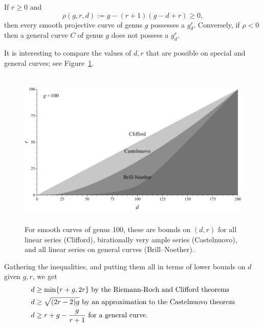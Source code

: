 \begin{theorem}\label{basic BN}
If $r\geq 0$ and
 $$
 \rho(g,r,d) := g - (r+1)(g-d+r) \geq 0,
$$
then every smooth projective curve of genus $g$  possesses a $g^r_d$. Conversely, if $\rho < 0$ then a general curve $C$ of genus $g$ does not possess a $g^r_d$.
\end{theorem}


It is interesting to compare the values of $d,r$ that are possible on special and general curves; see Figure~\ref{Clifford-Castelnuovo-BrillNoether comparison}.

\begin{figure}
\inprogress     
\centerline {\includegraphics[height=3in]{"main/Fig11-1-Clifford-Castelnuovo-Brill-Noether"}}
\caption{For smooth curves of genus 100, 
these are bounds on $(d,r)$ for all linear series (Clifford), 
birationally very ample series (Castelnuovo), and all linear series
on general curves (Brill--Noether). }
\label{Clifford-Castelnuovo-BrillNoether comparison}
\end{figure}

Gathering the inequalities, and putting them all in terms of lower bounds on $d$ given $g, r$,
we get \goodbreak
\begin{align*}
 d &\geq \min\{r+g, 2r\} \hbox{ by the Riemann-Roch and Clifford theorems}\\
 d &\geq \sqrt{(2r-2)g} \hbox{ by an approximation to the Castelnuovo theorem}\\
 d &\geq r+g-\frac{g}{r+1} \hbox{ for a general curve.}
\end{align*}


